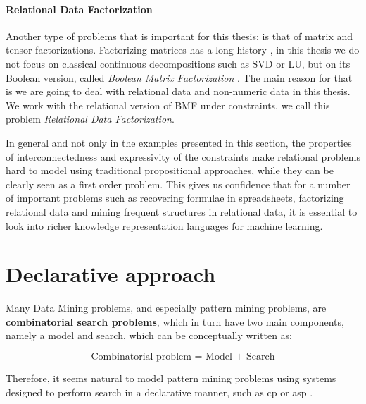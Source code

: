 \paragraph{Relational Data Factorization}\label{sec:intro_redf}
Another type of problems that is important for this thesis: is that of
matrix and tensor factorizations. Factorizing matrices has a long
history \parencite{matrix_book}, in this thesis we do not focus on
classical continuous decompositions such as SVD or LU, but on its
Boolean version, called \textit{Boolean Matrix
Factorization} \parencite{phd_miettinen}. The main reason for that is
we are going to deal with relational data and non-numeric data in this
thesis. We work with the relational version of BMF under constraints,
we call this problem \textit{Relational Data Factorization}.



In general and not only in the examples presented in this section, the
properties of interconnectedness and expressivity of the constraints
make relational problems hard to model using traditional propositional
approaches, while they can be clearly seen as a first order problem. This gives us confidence that for a number of important problems such as recovering formulae in spreadsheets, factorizing relational data and mining frequent structures in relational data, it is essential to look into richer knowledge representation languages for machine learning.

\section{Declarative approach}\label{sec:declarative_intro}
Many Data Mining problems, and especially pattern mining
problems, are \textbf{combinatorial search problems}, which in turn
have two main components, namely a model and search, which can be
conceptually written as:

\begin{center}
\begin{equation}\label{eq:declarative_schema}
  \text{Combinatorial problem = Model + Search}
\end{equation}
\end{center}

Therefore, it seems natural to model pattern mining problems 
using systems designed to perform search in a declarative manner, such
as \acrlong{cp} \parencite{handbookcp} or \acrlong{asp}
\parencite{whatisasp}. %

